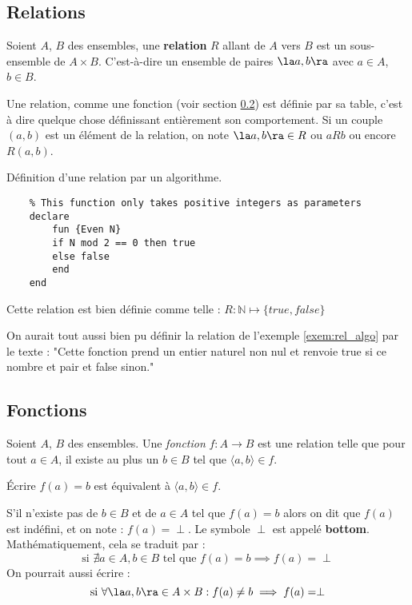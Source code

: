 
\subsection{Relations} \label{subsec:relations}
\begin{mydef}
    Soient $A$, $B$ des ensembles, une \textbf{relation} $R$ allant de $A$ vers $B$ est un sous-ensemble de $A \times B$. C'est-à-dire un ensemble de paires $\la a,b \ra$ avec $a\in A$, $b\in B$.
\end{mydef}

\begin{myrem}
  Une relation, comme une fonction (voir section \ref{subsec:fonctions}) est définie par sa table, c'est à dire quelque chose définissant entièrement son comportement. Si un couple $(a,b)$ est un élément de la relation, on note  $\la a,b \ra \in R$ ou $aR b$ ou encore $R(a,b)$.
\end{myrem}
\newpage
\begin{myexem}\label{exem:rel_algo}
    Définition d'une relation par un algorithme.
  \begin{lstlisting}
    % This function only takes positive integers as parameters
    declare 
        fun {Even N}
        if N mod 2 == 0 then true
        else false
        end
    end
  \end{lstlisting}
  Cette relation est bien définie comme telle : $R : \mathbb{N} \mapsto \{true, false\}$
\end{myexem}

\begin{myrem}
  On aurait tout aussi bien pu définir la relation de l'exemple \ref{exem:rel_algo} par le texte : "Cette fonction prend un entier naturel non nul et renvoie true si ce nombre et pair et false sinon."
\end{myrem}




\subsection{Fonctions}
\label{subsec:fonctions}

\begin{mydef}
    Soient $A$, $B$ des ensembles. Une \emph{fonction} $f \colon A \rightarrow B$ est une relation telle que pour tout $a \in A$, il existe au plus un $b \in B$ tel que $\langle a,b \rangle \in f$.
\end{mydef}
\begin{myrem}
    Écrire $f(a)=b$ est équivalent à $\langle a,b \rangle \in f$.
\end{myrem}
\begin{myrem}
    S'il n'existe pas de $b \in B$ et de $a \in A$ tel que $f(a)=b$ alors on dit que $f(a)$ est indéfini, et on note : $f(a) = \perp$. Le symbole $\perp$ est appelé \textbf{bottom}. Mathématiquement, cela se traduit par :
    $$ \text{si } \nexists a \in A, b \in B \text{ tel que } f(a) = b \implies f(a) = \perp $$
    On pourrait aussi écrire : 
    $$ \text{si }\forall \la a, b \ra \in A \times B : f(a) \neq b \implies f(a) = \perp $$
\end{myrem}

